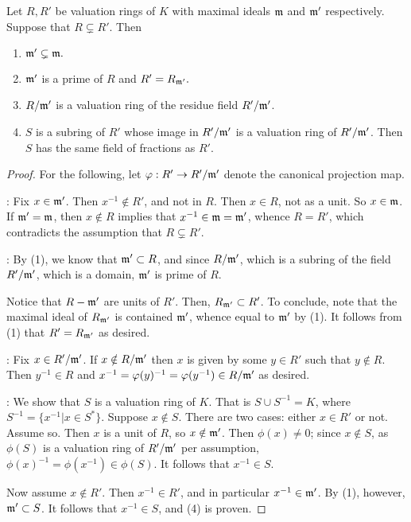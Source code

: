 \begin{prop}\label{thm_mats_10_1}
Let $R, R'$ be valuation rings of $K$ with maximal ideals 
$\mathfrak{m}$ and $\mathfrak{m'}$ respectively. Suppose that $R 
\subsetneq R'$. Then

\begin{enumerate}
\item $\mathfrak{m'} \subsetneq \mathfrak{m}.$

\item $\mathfrak{m'}$ is a prime of $R$ and $R' = R_{\mathfrak{m'}}.$

\item $R/\mathfrak{m'}$ is a valuation ring of the residue field 
$R'/\mathfrak{m'}$.

\item $S$ is a subring of $R'$ whose image in $R'/\mathfrak{m'}$ is 
a valuation ring of $R'/\mathfrak{m'}$. Then $S$ has the same field
of fractions as $R'$.
\end{enumerate}
\end{prop}
\begin{proof}
For the following, let $\varphi: R' \to R'/\mathfrak{m'}$ denote the
canonical projection map.

: Fix $x \in \mathfrak{m'}$. Then $x^{-1} \notin R'$,
and not in $R$. Then $x \in R$, not as a unit. So $x \in 
\mathfrak{m}$. If $\mathfrak{m'} = \mathfrak{m}$, then $x \notin R$ implies
that $x^{-1} \in \mathfrak{m} = \mathfrak{m'}$, whence $R = R'$, which
contradicts the assumption that $R \subsetneq R'$.

: By (1), we know that $\mathfrak{m'} \subset R$, and
since $R/\mathfrak{m'}$, which is a subring of the field 
$R'/\mathfrak{m'}$, which is a domain, $\mathfrak{m'}$ is prime of $R$.

Notice that $R - \mathfrak{m'}$ are units of $R'$. Then, 
$R_{\mathfrak{m'}} \subset R'$. To conclude, note that the maximal 
ideal of $R_{\mathfrak{m'}}$ is contained $\mathfrak{m'}$, whence equal 
to $\mathfrak{m'}$ by (1). It follows from (1) that $R' = 
R_{\mathfrak{m'}}$ as desired.

: Fix $x \in R'/\mathfrak{m'}$. If $x \notin 
R/\mathfrak{m'}$ then $x$ is given by some $y \in R'$ such that $y 
\notin R$. Then $y^{-1} \in R$ and $x^{-1} = \varphi(y)^{-1} = 
\varphi(y^{-1}) \in R/\mathfrak{m'}$ as desired.

: We show that $S$ is a valuation ring of $K$. That
is $S \cup S^{-1} = K$, where $S^{-1} = \{x^{-1} | x \in S^*\}$. 
Suppose $x \notin S$. There are two cases: either $x \in R'$ or 
not. Assume so. Then $x$ is a unit of $R$, so $x \notin 
\mathfrak{m'}$. Then $\phi(x) \neq 0$; since $x \notin S$, as 
$\phi(S)$ is a valuation ring of $R'/\mathfrak{m'}$ per assumption, 
$\phi(x)^{-1} = \phi(x^{-1}) \in \phi(S)$. It follows that 
$x^{-1} \in S$.

Now assume $x \notin R'$. Then $x^{-1} \in R'$, and in particular
$x^{-1} \in \mathfrak{m'}$. By (1), however, $\mathfrak{m'} \subset S$.
It follows that $x^{-1} \in S$, and (4) is proven.
\end{proof}

